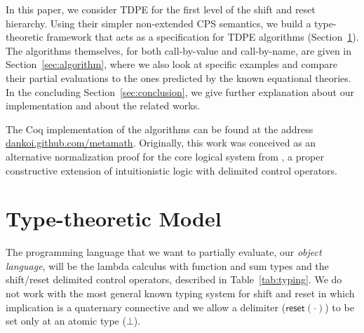 \documentclass{eptcs}
\newcommand{\reset}[1]{\mathsf{reset}{(#1)}}
\theoremstyle{definition}
\theoremstyle{plain}
\theoremstyle{remark}
\begin{document}
In this paper, we consider TDPE for the first level of the shift and reset hierarchy. Using their simpler non-extended CPS semantics, we build a type-theoretic framework that acts as a specification for TDPE algorithms (Section~\ref{sec:model}). The algorithms themselves, for both call-by-value and call-by-name, are given in Section~\ref{sec:algorithm}, where we also look at specific examples and compare their partial evaluations to the ones predicted by the known equational theories. In the concluding Section~\ref{sec:conclusion}, we give further explanation about our implementation and about the related works.

The Coq implementation of the algorithms can be found at the address \href{http://dankoi.github.com/metamath/}{dankoi.github.com/metamath}. Originally, this work was conceived as an alternative normalization proof for the core logical system from \cite{Ilik2010}, a proper constructive extension of intuitionistic logic with delimited control operators.

\section{Type-theoretic Model}\label{sec:model}

The programming language that we want to partially evaluate, our \emph{object language}, will be the lambda calculus with function and sum types and the shift/reset delimited control operators, described in Table~\ref{tab:typing}. We do not work with the most general known typing system for shift and reset in which implication is a quaternary connective \cite{DanvyF1989} and we allow a delimiter ($\reset{\cdot}$) to be set only at an atomic type ($\bot$).
\end{document}

